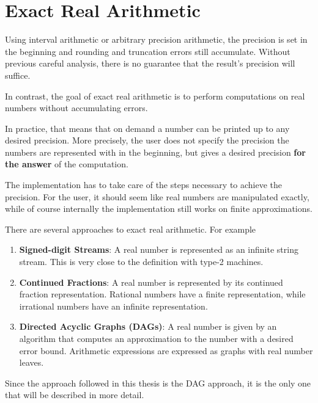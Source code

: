 \section{Exact Real Arithmetic}\label{sec:exact real arithmetic}
	Using interval arithmetic or arbitrary precision arithmetic, 
	the precision is set in the beginning and rounding and truncation errors still accumulate.
	Without previous careful analysis, there is no guarantee that the result's
  precision will suffice.

	In contrast, the goal of exact real arithmetic is to perform computations on real numbers without 
	accumulating errors.
  
  In practice, that means that on demand a number can be printed up to any desired precision. 
	More precisely, the user does not specify the precision the numbers are represented with in the beginning,
	but gives a desired precision \textbf{for the answer} of the computation.
  
  The implementation has to take care of the steps necessary to achieve the
  precision.
  For the user, it should seem like real numbers are manipulated exactly, while
  of course internally the implementation still works on finite approximations.

	There are several approaches to exact real arithmetic.
	For example
  \begin{enumerate}
      \item \textbf{Signed-digit Streams}: A real number is represented as an infinite
       string stream. This is very close to the definition with type-2
       machines.
     \item \textbf{Continued Fractions}: A real number is represented by its continued
       fraction representation. Rational numbers have a finite representation,
       while irrational numbers have an infinite representation.
     \item \textbf{Directed Acyclic Graphs (DAGs)}: A real number is given by an
       algorithm that computes an approximation to the number with a desired
       error bound. Arithmetic expressions are expressed as graphs with real
       number leaves.
  \end{enumerate}
  Since the approach followed in this thesis is the DAG approach, it is the
  only one that will be described in more detail.

